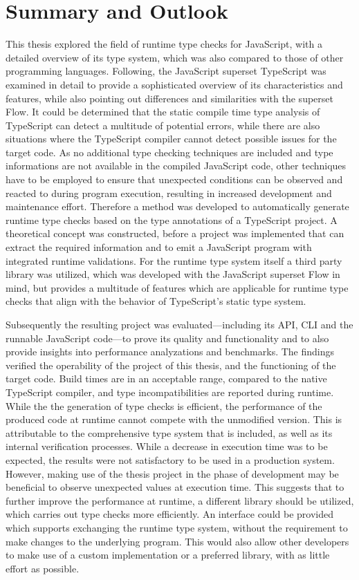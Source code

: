 \chapter{Summary and Outlook}
\label{cha:summary_outlook}

This thesis explored the field of runtime type checks for JavaScript, with a detailed overview of its type system, which was also compared to those of other programming languages. Following, the JavaScript superset TypeScript was examined in detail to provide a sophisticated overview of its characteristics and features, while also pointing out differences and similarities with the superset Flow. It could be determined that the static compile time type analysis of TypeScript can detect a multitude of potential errors, while there are also situations where the TypeScript compiler cannot detect possible issues for the target code. As no additional type checking techniques are included and type informations are not available in the compiled JavaScript code, other techniques have to be employed to ensure that unexpected conditions can be observed and reacted to during program execution, resulting in increased development and maintenance effort. Therefore a method was developed to automatically generate runtime type checks based on the type annotations of a TypeScript project. A theoretical concept was constructed, before a project was implemented that can extract the required information and to emit a JavaScript program with integrated runtime validations. For the runtime type system itself a third party library was utilized, which was developed with the JavaScript superset Flow in mind, but provides a multitude of features which are applicable for runtime type checks that align with the behavior of TypeScript's static type system.

Subsequently the resulting project was evaluated---including its API, CLI and the runnable JavaScript code---to prove its quality and functionality and to also provide insights into performance analyzations and benchmarks. The findings verified the operability of the project of this thesis, and the functioning of the target code. Build times are in an acceptable range, compared to the native TypeScript compiler, and type incompatibilities are reported during runtime. While the the generation of type checks is efficient, the performance of the produced code at runtime cannot compete with the unmodified version. This is attributable to the comprehensive type system that is included, as well as its internal verification processes. While a decrease in execution time was to be expected, the results were not satisfactory to be used in a production system. However, making use of the thesis project in the phase of development may be beneficial to observe unexpected values at execution time. This suggests that to further improve the performance at runtime, a different library should be utilized, which carries out type checks more efficiently. An interface could be provided which supports exchanging the runtime type system, without the requirement to make changes to the underlying program. This would also allow other developers to make use of a custom implementation or a preferred library, with as little effort as possible.

